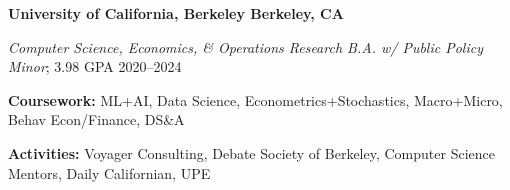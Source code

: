 \textbf{University of California, Berkeley \hfill Berkeley, CA} \par
\textit{Computer Science, Economics, \& Operations Research B.A. w/ Public Policy Minor}; 3.98 GPA \hfill 2020--2024\par
\textbf{Coursework:} ML+AI, Data Science, Econometrics+Stochastics, Macro+Micro, Behav Econ/Finance, DS\&A\par
\textbf{Activities:} Voyager Consulting, Debate Society of Berkeley, Computer Science Mentors, Daily Californian, UPE